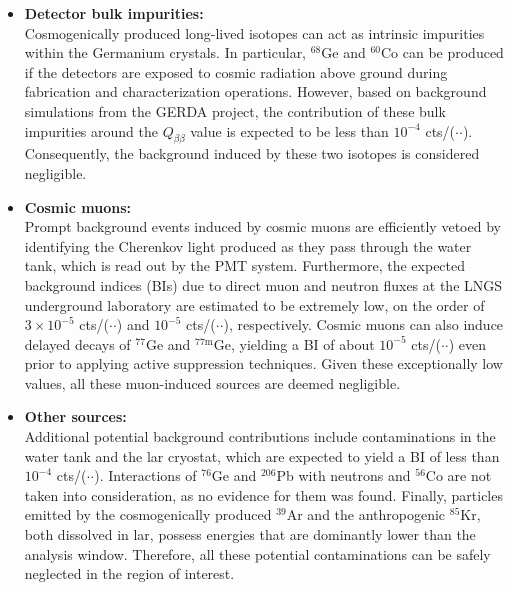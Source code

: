 \begin{itemize}
\item \textbf{Detector bulk impurities:}\\
            Cosmogenically produced long-lived isotopes can act as intrinsic impurities within the Germanium crystals. In particular, ${}^{68}$Ge and ${}^{60}$Co can be produced if the detectors are exposed to cosmic radiation above ground during fabrication and characterization operations. However, based on background simulations from the GERDA project, the contribution of these bulk impurities around the $Q_{\beta\beta}$ value is expected to be less than $10^{-4}$ cts/($\cdot$$\cdot$). Consequently, the background induced by these two isotopes is considered negligible.

    \item \textbf{Cosmic muons:}\\
            Prompt background events induced by cosmic muons are efficiently vetoed by identifying the Cherenkov light produced as they pass through the water tank, which is read out by the \ac{PMT} system. Furthermore, the expected background indices (BIs) due to direct muon and neutron fluxes at the LNGS underground laboratory are estimated to be extremely low, on the order of $3 \times 10^{-5}$ cts/($\cdot$$\cdot$) and $10^{-5}$ cts/($\cdot$$\cdot$), respectively. Cosmic muons can also induce delayed decays of ${}^{77}$Ge and ${}^{77\text{m}}$Ge, yielding a BI of about $10^{-5}$ cts/($\cdot$$\cdot$) even prior to applying active suppression techniques. Given these exceptionally low values, all these muon-induced sources are deemed negligible.
            
    \item \textbf{Other sources:}\\
            Additional potential background contributions include contaminations in the water tank and the \ac{lar} cryostat, which are expected to yield a BI of less than $10^{-4}$ cts/($\cdot$$\cdot$). Interactions of ${}^{76}$Ge and ${}^{206}$Pb with neutrons and ${}^{56}$Co are not taken into consideration, as no evidence for them was found. Finally, particles emitted by the cosmogenically produced ${}^{39}$Ar and the anthropogenic ${}^{85}$Kr, both dissolved in \ac{lar}, possess energies that are dominantly lower than the analysis window. Therefore, all these potential contaminations can be safely neglected in the region of interest.

\end{itemize}

